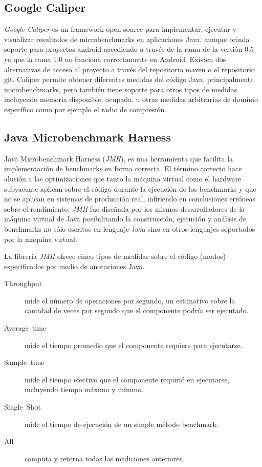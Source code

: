 \subsection{Google Caliper \label{sub:Google-caliper}}

\emph{Google Caliper} es un framework open source para implementar,
ejecutar y visualizar resultados de microbenchmarks en aplicaciones
Java, aunque brinda soporte para proyectos android accediendo a través
de la rama de la versión 0.5 ya que la rama 1.0 no funciona correctamente
en Android. Existen dos alternativas de acceso al proyecto a través
del repositorio maven o el repositorio git. Caliper permite obtener
diferentes medidas del código Java, principalmente microbenchmarks,
pero también tiene soporte para otros tipos de medidas incluyendo
memoria disponible, ocupada, u otras medidas arbitrarias de dominio
específico como por ejemplo el radio de compresión. 


\subsection{Java Microbenchmark Harness\label{sub:Java-Microbenchmark-Harness}}

Java Microbenchmark Harness (\emph{JMH}), es una herramienta que facilita
la implementación de benchmarks en forma correcta. El término correcto
hace alusión a las optimizaciones que tanto la máquina virtual como
el hardware subyacente aplican sobre el código durante la ejecución
de los benchmarks y que no se aplican en sistemas de producción real,
infiriendo en conclusiones erróneas sobre el rendimiento. \emph{JMH}
fue diseñada por los mismos desarrolladores de la máquina virtual
de Java posibilitando la construcción, ejecución y análisis de benchmarks
no sólo escritos en lenguaje Java sino en otros lenguajes soportados
por la máquina virtual. 

La librería \emph{JMH} ofrece cinco tipos de medidas sobre el código
(modos) especificados por medio de anotaciones Java. 
\begin{description}
\item [{Throughput}] mide el número de operaciones por segundo, un estimativo
sobre la cantidad de veces por segundo que el componente podría ser
ejecutado. 
\item [{Average~time}] mide el tiempo promedio que el componente requiere
para ejecutarse.
\item [{Sample~time}] mide el tiempo efectivo que el componente requirió
en ejecutarse, incluyendo tiempo máximo y mínimo. 
\item [{Single~Shot}] mide el tiempo de ejecución de un simple método
benchmark. 
\item [{All}] computa y retorna todas las mediciones anteriores. 
\end{description}

